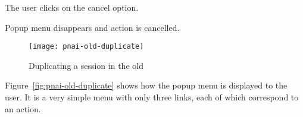 \begin{center}
\begin{usecase}
{\begin{usecasepath}[c]
        \setcounter{enumi}{4}
        \item The user clicks on the cancel option.
        \item Popup menu disappears and action is cancelled.
      \end{usecasepath}
    }
  \end{usecase}
\end{center}

\begin{figure}[htbp]
  \centering
    \texttt{[image: pnai-old-duplicate]}
  \caption{Duplicating a session in the old }
  \label{fig:pnai-old-duplicate}
\end{figure}

Figure~\vref{fig:pnai-old-duplicate} shows how the popup menu is displayed to the user.
It is a very simple menu with only three links, each of which correspond to an action.

